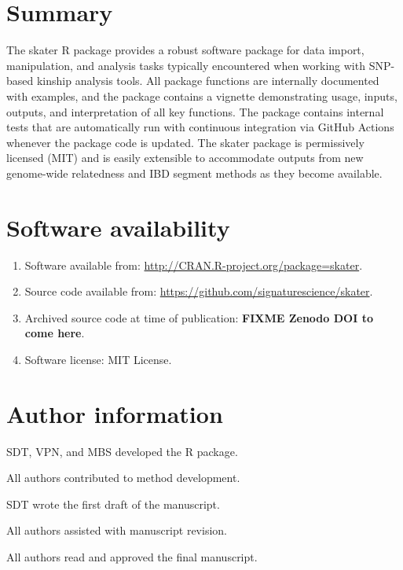 \documentclass[9pt,a4paper,]{extarticle}
\begin{document}
\hypertarget{summary}{%
\section{Summary}\label{summary}}

The skater R package provides a robust software package for data import, manipulation, and analysis tasks typically encountered when working with SNP-based kinship analysis tools. All package functions are internally documented with examples, and the package contains a vignette demonstrating usage, inputs, outputs, and interpretation of all key functions. The package contains internal tests that are automatically run with continuous integration via GitHub Actions whenever the package code is updated. The skater package is permissively licensed (MIT) and is easily extensible to accommodate outputs from new genome-wide relatedness and IBD segment methods as they become available.

\hypertarget{software-availability}{%
\section{Software availability}\label{software-availability}}

\begin{enumerate}
\def\labelenumi{\arabic{enumi}.}
\item
  Software available from: \url{http://CRAN.R-project.org/package=skater}.
\item
  Source code available from: \url{https://github.com/signaturescience/skater}.
\item
  Archived source code at time of publication: \textbf{FIXME Zenodo DOI to come here}.
\item
  Software license: MIT License.
\end{enumerate}

\hypertarget{author-information}{%
\section{Author information}\label{author-information}}

SDT, VPN, and MBS developed the R package.

All authors contributed to method development.

SDT wrote the first draft of the manuscript.

All authors assisted with manuscript revision.

All authors read and approved the final manuscript.
\end{document}
